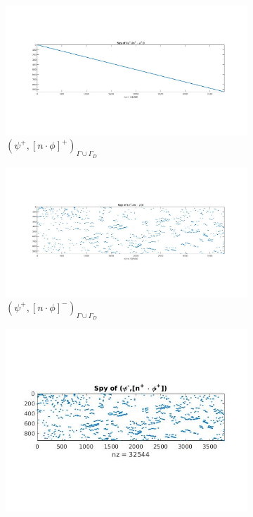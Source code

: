 \documentclass[a4paper,12pt]{book}
\begin{document}
\begin{figure}[H]
\begin{subfigure}{.5\textwidth}
\centering
  \includegraphics[width=\linewidth]{figure41.jpg}
  \caption{$( \psi^+ ,[n \cdot \phi]^+)_{\Gamma \cup \Gamma_D}$}
  \label{fig:figure41}
\end{subfigure}
\begin{subfigure}{.5\textwidth}	
\centering
  \includegraphics[width=\linewidth]{figure42.jpg}
  \caption{$( \psi^+ ,[n \cdot \phi]^-)_{\Gamma \cup \Gamma_D}$}
  \label{fig:figure42}
\end{subfigure}
\begin{subfigure}{.5\textwidth}
\centering
  \includegraphics[width=\linewidth]{figure43.jpg}

\end{subfigure}
\end{figure}
\end{document}
